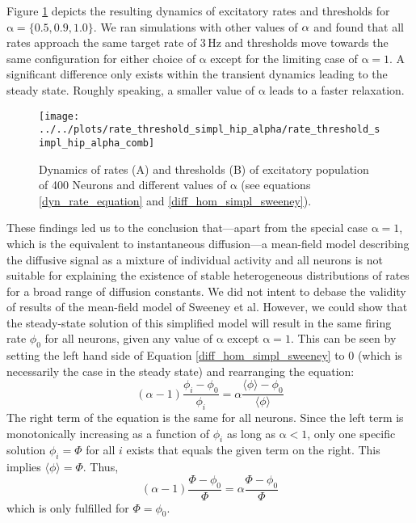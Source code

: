 \documentclass[10pt,a4paper]{article}
\begin{document}
Figure \ref{dynamics_rate_threshold_dyn_mean_field_sweeney} depicts the resulting dynamics of excitatory rates and thresholds for $\mathrm{\alpha=\lbrace 0.5,0.9,1.0\rbrace}$. We ran simulations with other values of $\rm \alpha$ and found that all rates approach the same target rate of $\mathrm{3\,Hz}$ and thresholds move towards the same configuration for either choice of $\mathrm{\alpha}$ except for the limiting case of $\mathrm{\alpha=1}$. A significant difference only exists within the transient dynamics leading to the steady state. Roughly speaking, a smaller value of $\mathrm{\alpha}$ leads to a faster relaxation.
\begin{figure}
\texttt{[image: ../../plots/rate\_threshold\_simpl\_hip\_alpha/rate\_threshold\_simpl\_hip\_alpha\_comb]}
\caption{Dynamics of rates (A) and thresholds (B) of excitatory population of 400 Neurons and different values of $\mathrm{\alpha}$ (see equations \eqref{dyn_rate_equation} and \eqref{diff_hom_simpl_sweeney}).}
\label{dynamics_rate_threshold_dyn_mean_field_sweeney}
\end{figure}
These findings led us to the conclusion that---apart from the special case $\mathrm{\alpha=1}$, which is the equivalent to instantaneous diffusion---a mean-field model describing the diffusive signal as a mixture of individual activity and all neurons is not suitable for explaining the existence of stable heterogeneous distributions of rates for a broad range of diffusion constants. We did not intent to debase the validity of results of the mean-field model of Sweeney et al. However, we could show that the steady-state solution of this simplified model will result in the same firing rate $\phi_0$ for all neurons, given any value of $\mathrm{\alpha}$ except $\mathrm{\alpha=1}$. This can be seen by setting the left hand side of Equation \eqref{diff_hom_simpl_sweeney} to $0$ (which is necessarily the case in the steady state) and rearranging the equation:
\begin{equation}
(\alpha-1)\frac{\phi_i - \phi_0}{\phi_i} = \alpha \frac{\langle \phi \rangle - \phi_0}{\langle \phi \rangle}
\label{diff_hom_simpl_sweeney_2}
\end{equation}
The right term of the equation is the same for all neurons. Since the left term is monotonically increasing as a function of $\phi_i$ as long as $\mathrm{\alpha<1}$, only one specific solution $\phi_i = \Phi$ for all $i$ exists that equals the given term on the right. This implies $\langle \phi \rangle = \Phi$. Thus,
\begin{equation}
(\alpha-1)\frac{\Phi - \phi_0}{\Phi} = \alpha \frac{\Phi - \phi_0}{\Phi}
\label{diff_hom_simpl_sweeney_3}
\end{equation}
which is only fulfilled for $\Phi = \phi_0$.
\end{document}
